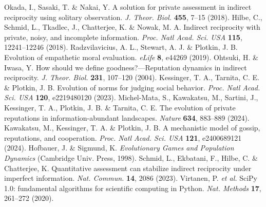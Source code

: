 Okada, I., Sasaki, T. \& Nakai, Y.
A solution for private assessment in indirect reciprocity using solitary observation.
\textit{J. Theor. Biol.} \textbf{455}, 7--15 (2018).
Hilbe, C., Schmid, L., Tkadlec, J., Chatterjee, K. \& Nowak, M. A.
Indirect reciprocity with private, noisy, and incomplete information.
\textit{Proc. Natl Acad. Sci. USA} \textbf{115}, 12241--12246 (2018).
Radzvilavicius, A. L., Stewart, A. J. \& Plotkin, J. B.
Evolution of empathetic moral evaluation.
\textit{eLife} \textbf{8}, e44269 (2019).
Ohtsuki, H. \& Iwasa, Y.
How should we define goodness?---Reputation dynamics in indirect reciprocity.
\textit{J. Theor. Biol.} \textbf{231}, 107--120 (2004).
Kessinger, T. A., Tarnita, C. E. \& Plotkin, J. B.
Evolution of norms for judging social behavior.
\textit{Proc. Natl Acad. Sci. USA} \textbf{120}, e2219480120 (2023).
Michel-Mata, S., Kawakatsu, M., Sartini, J., Kessinger, T. A., Plotkin, J. B. \& Tarnita, C. E.
The evolution of private reputations in information-abundant landscapes.
\textit{Nature} \textbf{634}, 883--889 (2024).
Kawakatsu, M., Kessinger, T. A. \& Plotkin, J. B.
A mechanistic model of gossip, reputations, and cooperation.
\textit{Proc. Natl Acad. Sci. USA} \textbf{121}, e2400689121 (2024).
Hofbauer, J. \& Sigmund, K.
\textit{Evolutionary Games and Population Dynamics}
(Cambridge Univ. Press, 1998).
Schmid, L., Ekbatani, F., Hilbe, C. \& Chatterjee, K.
Quantitative assessment can stabilize indirect reciprocity under imperfect information.
\textit{Nat. Commun.} \textbf{14}, 2086 (2023).
Virtanen, P. \textit{et al.}
SciPy 1.0: fundamental algorithms for scientific computing in Python.
\textit{Nat. Methods} \textbf{17}, 261--272 (2020).
